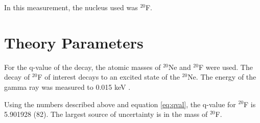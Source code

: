 In this measurement, the nucleus used was $^{20}$F.

\section{Theory Parameters}

For the q-value of the decay, the atomic masses of $^{20}$Ne and $^{20}$F were used.
The decay of $^{20}$F of interest decays to an excited state of the $^{20}$Ne.
The energy of the gamma ray was measured to 0.015 keV \cite{Til98}.

Using the numbers described above and equation \ref{eq:qval}, the q-value for $^{20}$F is 5.901928 (82).
The largest source of uncertainty is in the mass of $^{20}$F.

